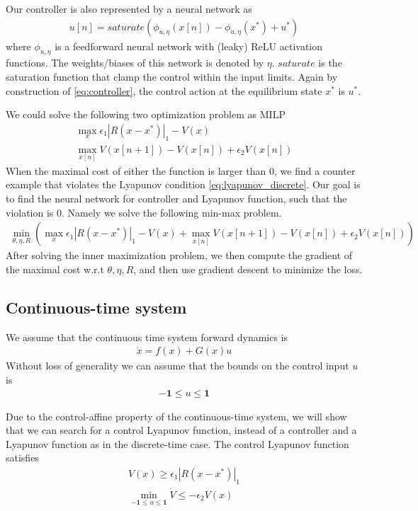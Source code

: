 \documentclass{article}
\begin{document}
Our controller is also represented by a neural network as
\begin{align}
	u[n] = saturate(\phi_{u, \eta}(x[n]) - \phi_{u, \eta}(x^*) + u^*)\label{eq:controller}
\end{align}
where $\phi_{u, \eta}$ is a feedforward neural network with (leaky) ReLU activation functions. The weights/biases of this network is denoted by $\eta$. $saturate$ is the saturation function that clamp the control within the input limits. Again by construction of \eqref{eq:controller}, the control action at the equilibrium state $x^*$ is $u^*$.

We could solve the following two optimization problem as MILP
\begin{align}
	\max_{x} \epsilon_1|R(x-x^*)|_1 - V(x)\\
	\max_{x[n]} V(x[n+1]) - V(x[n]) + \epsilon_2V(x[n])
\end{align}
When the maximal cost of either the function is larger than 0, we find a counter example that violates the Lyapunov condition \eqref{eq:lyapunov_discrete}. Our goal is to find the neural network for controller and Lyapunov function, such that the violation is 0. Namely we solve the following min-max problem.
\begin{align}
	\min_{\theta, \eta, R} \left(\max_{x}\epsilon_1|R(x-x^*)|_1 - V(x) + \max_{x[n]} V(x[n+1]) - V(x[n]) + \epsilon_2V(x[n])\right)
\end{align}
After solving the inner maximization problem, we then compute the gradient of the maximal cost w.r.t $\theta, \eta, R$, and then use gradient descent to minimize the loss.

\subsection{Continuous-time system}
We assume that the continuous time system forward dynamics is
\begin{align}
	\dot{x} = f(x) + G(x)u
\end{align}
Without loss of generality we can assume that the bounds on the control input $u$ is 
\begin{align}
	-\mathbf{1}\le u \le \mathbf{1}
\end{align}

Due to the control-affine property of the continuous-time system, we will show that we can search for a control Lyapunov function, instead of a controller and a Lyapunov function as in the discrete-time case. The control Lyapunov function satisfies
\begin{subequations}
\begin{align}
	V(x) \ge \epsilon_1|R(x-x^*)|_1\\
	\min_{-\mathbf{1}\le u\le \mathbf{1}} \dot{V}\le -\epsilon_2V(x)\label{eq:lyapunov_condition_Vdot_continuous}
\end{align}
\label{eq:lyapunov_condition_continuous}
\end{subequations}
\end{document}
